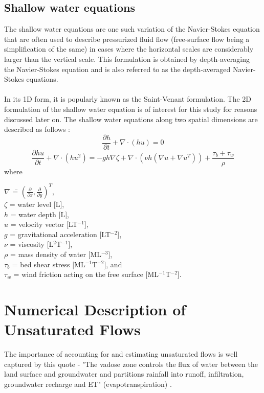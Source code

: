 \subsection{Shallow water equations}
The shallow water equations are one such variation of the Navier-Stokes equation that are often used to describe pressurized fluid flow (free-surface flow being a simplification of the same) in cases where the horizontal scales are considerably larger than the vertical scale. This formulation is obtained by depth-averaging the Navier-Stokes equation and is also referred to as the depth-averaged Navier-Stokes equations.
\\ \\
In its 1D form, it is popularly known as the Saint-Venant formulation. The 2D formulation of the shallow water equation is of interest for this study for reasons discussed later on. The shallow water equations along two spatial dimensions are described as follows \cite{Deltares}:
\begin{equation} \label{eq:shallow_water_mass}
    {\frac{\partial h}{\partial t}} + {\nabla \cdot (hu)} = 0
\end{equation}
\begin{equation} \label{eq:shallow_water_momentum}
    {\frac{\partial hu}{\partial t}} + {\nabla \cdot (hu^2)} = -{gh\nabla\zeta} + {\nabla \cdot (\nu h(\nabla u + \nabla u^T)) + \frac{\tau_b+\tau_w}{\rho}}
\end{equation}
where
\begin{tabbing}
    $\nabla$ \hspace{.4in}\= = $\left(\frac{\partial}{\partial x},\frac{\partial}{\partial y}\right)^T$,\\
    $\zeta$ \>= water level [L], \\
    $h$ \>= water depth [L], \\
    $u$ \>= velocity vector [LT$^{-1}$], \\
    $g$ \>= gravitational acceleration [LT$^{-2}$], \\
    $\nu$ \>= viscosity [L$^2$T$^{-1}$], \\
    $\rho$ \>= mass density of water [ML$^{-3}$], \\
    $\tau_b$ \>= bed shear stress [ML$^{-1}$T$^{-2}$], and\\
    $\tau_w$ \>= wind friction acting on the free surface [ML$^{-1}$T$^{-2}$]. \\
\end{tabbing}


\section{Numerical Description of Unsaturated Flows}
The importance of accounting for and estimating unsaturated flows is well captured by this quote - "The vadose zone controls the ﬂux of water between the land surface and groundwater and partitions rainfall into runoff, inﬁltration, groundwater recharge and ET" (evapotranspiration) \cite{Downer2004}.
